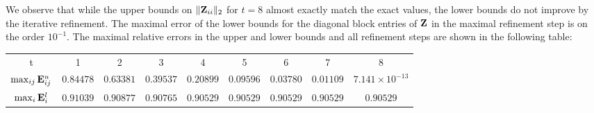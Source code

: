 \begin{example}
{We observe that while the upper bounds on $\|\mathbf{Z}_{ii}\|_2$ for
\textnormal{$t=8$} almost exactly match the exact values, the lower bounds do
not improve by the iterative refinement. The maximal error of the lower bounds
for the diagonal block entries of $\mathbf{Z}$ in the maximal refinement step is on the
order $10^{-1}$. The maximal relative errors in the upper and lower bounds and
all refinement steps are shown in the following table:
%
\begin{table}[h!]\scriptsize\centering%
\begin{tabular}{c c c c c c c c c}
\hline
 t & 1 & 2 & 3 & 4 & 5 & 6 & 7 & 8 \\
 $\max_{ij}\mathbf{E}^{u}_{ij}$ &  $0.84478$ &   $0.63381$  &  $0.39537$ &  $0.20899$  & $0.09596$ &  $0.03780$ & $0.01109$ & $7.141\times 10^{-13}$\\
 $\max_i \mathbf{E}^{l}_{i}$ & $0.91039$ & $0.90877$ &  $0.90765$ & $0.90529$ & $0.90529$ & $0.90529$ & $0.90529$ &  $0.90529$\\
\hline
\end{tabular}
\end{table}
%
%
\begin{figure}[h!]
\vspace{-0.9em}
\hspace{-1cm}
\centering
\hspace*{2em}
\begin{minipage}[t]{0.48\linewidth}
\centering

\end{minipage}
\end{figure}}
\end{example}
